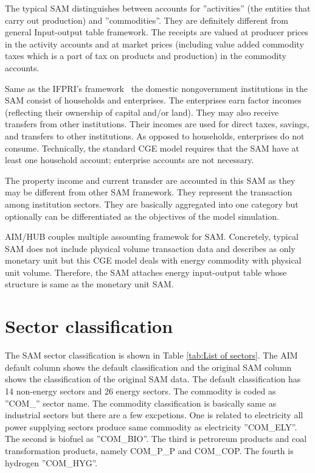 \documentclass[10pt,a4paper,titlepage,dvipdfmx]{book}
\begin{document}
The typical SAM distinguishes between accounts for ''activities'' (the entities that carry out production) and ''commodities''. They are definitely different from general Input-output table framework. The receipts are valued at producer prices in the activity accounts and at market prices (including value added commodity taxes which is a part of tax on products and production) in the commodity accounts. 

Same as the IFPRI's framework~\cite{RN2739} the domestic nongovernment institutions in the SAM consist of households and enterprises. The enterprises earn factor incomes (reflecting their ownership of capital and/or land). They may also receive transfers from other institutions. Their incomes are used for direct taxes, savings, and transfers to other institutions. As opposed to households, enterprises do not consume. Technically, the standard CGE model requires that the SAM have at least one household account; enterprise accounts are not necessary. 

The property income and current transder are accounted in this SAM as they may be different from other SAM framework. They represent the transaction among institution sectors. They are basically aggregated into one category but optionally can be differentiated as the objectives of the model simulation.

AIM/HUB couples multiple assounting framewok for SAM. Concretely, typical SAM does not include physical volume transaction data and describes as only monetary unit but this CGE model deals with energy commodity with physical unit volume. Therefore, the SAM attaches energy input-output table whose structure is same as the monetary unit SAM.

\section{\label{sec:SecClas}Sector classification}

The SAM sector classification is shown in Table \ref{tab:List of sectors}. The AIM default column shows the default classification and the original SAM column shows the classification of the original SAM data. The default classification has 14 non-energy sectors and 26 energy sectors. The commodity is coded as ''COM\_'' sector name. The commodity classification is basically same as industrial sectors but there are a few excpetions. One is related to electricity all power supplying sectors produce same commodity as electricity ''COM\_ELY''. The second is biofuel as ''COM\_BIO''. The third is petroreum products and coal transformation products, namely COM\_P\_P and COM\_COP. The fourth is hydrogen ''COM\_HYG''.
\end{document}
